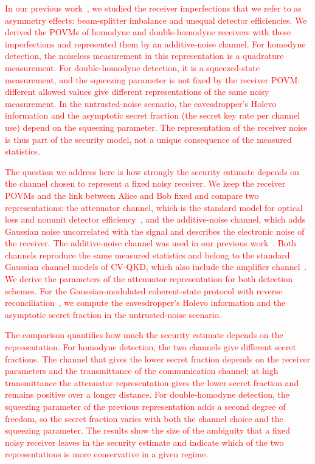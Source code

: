 \documentclass[%
final, 
superscriptaddress,
 amsmath,amssymb,amsfonts,
 aps,
 pra,
 longbibliography,
]{revtex4-2}
\begin{document}
\textcolor{red}{In our previous work~\cite{naumchik2025asymmetryeffectshomodyneheterodyne}, we studied the receiver imperfections that we refer to as asymmetry effects: beam-splitter imbalance and unequal detector efficiencies. We derived the POVMs of homodyne and double-homodyne receivers with these imperfections and represented them by an additive-noise channel. For homodyne detection, the noiseless measurement in this representation is a quadrature measurement. For double-homodyne detection, it is a squeezed-state measurement, and the squeezing parameter is not fixed by the receiver POVM: different allowed values give different representations of the same noisy measurement. In the untrusted-noise scenario, the eavesdropper's Holevo information and the asymptotic secret fraction (the secret key rate per channel use) depend on the squeezing parameter. The representation of the receiver noise is thus part of the security model, not a unique consequence of the measured statistics.}

\textcolor{red}{The question we address here is how strongly the security estimate depends on the channel chosen to represent a fixed noisy receiver. We keep the receiver POVMs and the link between Alice and Bob fixed and compare two representations: the attenuator channel, which is the standard model for optical loss and nonunit detector efficiency~\cite{Lodewyck:pra:2007,laudenbach2018continuous}, and the additive-noise channel, which adds Gaussian noise uncorrelated with the signal and describes the electronic noise of the receiver. The additive-noise channel was used in our previous work~\cite{naumchik2025asymmetryeffectshomodyneheterodyne}. Both channels reproduce the same measured statistics and belong to the standard Gaussian channel models of CV-QKD, which also include the amplifier channel~\cite{Caruso2006,PirandolaCollectiveGaussian2008,NamikiHirano2005,Namiki2006}. We derive the parameters of the attenuator representation for both detection schemes. For the Gaussian-modulated coherent-state protocol with reverse reconciliation~\cite{Grosshans:prl:2002}, we compute the eavesdropper's Holevo information and the asymptotic secret fraction in the untrusted-noise scenario.}

\textcolor{red}{The comparison quantifies how much the security estimate depends on the representation. For homodyne detection, the two channels give different secret fractions. The channel that gives the lower secret fraction depends on the receiver parameters and the transmittance of the communication channel; at high transmittance the attenuator representation gives the lower secret fraction and remains positive over a longer distance. For double-homodyne detection, the squeezing parameter of the previous representation adds a second degree of freedom, so the secret fraction varies with both the channel choice and the squeezing parameter. The results show the size of the ambiguity that a fixed noisy receiver leaves in the security estimate and indicate which of the two representations is more conservative in a given regime.}
\end{document}
